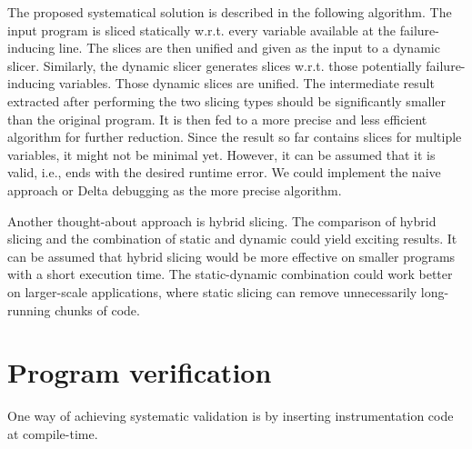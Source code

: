 The proposed systematical solution is described in the following algorithm.
The input program is sliced statically w.r.t.
every variable available at the failure-inducing line.
The slices are then unified and given as the input to a dynamic slicer.
Similarly, the dynamic slicer generates slices w.r.t.
those potentially failure-inducing variables.
Those dynamic slices are unified.
The intermediate result extracted after performing the two slicing types 
should be significantly smaller than the original program.
It is then fed to a more precise and less efficient algorithm for further 
reduction.
Since the result so far contains slices for multiple variables, it might not 
be minimal yet.
However, it can be assumed that it is valid, i.e., ends with the desired 
runtime error.
We could implement the naive approach or Delta debugging as the more 
precise algorithm.


Another thought-about approach is hybrid slicing.
The comparison of hybrid slicing and the combination of static and dynamic 
could yield exciting results.
It can be assumed that hybrid slicing would be more effective on smaller 
programs with a short execution time.
The static-dynamic combination could work better on larger-scale 
applications, where static slicing can remove unnecessarily long-running 
chunks of code.


\section{Program verification}




One way of achieving systematic validation is by inserting 
instrumentation code at compile-time.

